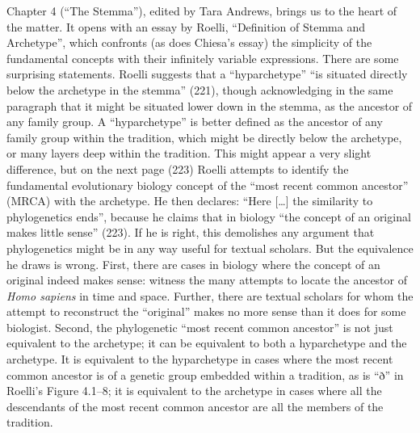 \begin{review}
Chapter 4 (``The Stemma''), edited by Tara Andrews, brings us
to the heart of the matter. It opens with an essay by Roelli,
``Definition of Stemma and Archetype'', which confronts (as does
Chiesa's essay) the simplicity of the fundamental concepts with their
infinitely variable expressions. There are some surprising statements.
Roelli suggests that a ``hyparchetype'' ``is situated directly below the
archetype in the stemma'' (221), though acknowledging in the same
paragraph that it might be situated lower down in the stemma, as the
ancestor of any family group. A ``hyparchetype'' is better defined as
the ancestor of any family group within the tradition, which might be
directly below the archetype, or many layers deep within the tradition.
This might appear a very slight difference, but on the next page (223)
Roelli attempts to identify the fundamental evolutionary biology concept
of the ``most recent common ancestor'' (MRCA) with the archetype. He
then declares: ``Here [\ldots] the similarity to phylogenetics
ends'', because he claims that in biology ``the concept of an original
makes little sense'' (223). If he is right, this demolishes any argument
that phylogenetics might be in any way useful for textual scholars. But
the equivalence he draws is wrong. First, there are cases in biology
where the concept of an original indeed makes sense: witness the many
attempts to locate the ancestor of \emph{Homo sapiens} in time and
space. Further, there are textual scholars for whom the attempt to
reconstruct the ``original'' makes no more sense than it does for some
biologist. Second, the phylogenetic ``most recent common ancestor'' is
not just equivalent to the archetype; it can be equivalent to both a
hyparchetype and the archetype. It is equivalent to the hyparchetype in
cases where the most recent common ancestor is of a genetic group
embedded within a tradition, as is ``ð'' in Roelli's Figure 4.1--8; it is
equivalent to the archetype in cases where all the descendants of the
most recent common ancestor are all the members of the tradition.


\end{review}

